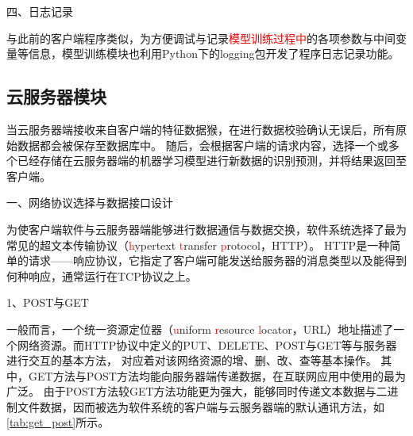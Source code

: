 四、日志记录

与此前的客户端程序类似，为方便调试与记录\textcolor{red}{模型训练过程中}的各项参数与中间变量等信息，模型训练模块也利用Python下的logging包\cite{logging}开发了程序日志记录功能。


\subsection{云服务器模块}
当云服务器端接收来自客户端的特征数据猴，在进行数据校验确认无误后，所有原始数据都会被保存至数据库中。
随后，会根据客户端的请求内容，选择一个或多个已经存储在云服务器端的机器学习模型进行新数据的识别预测，并将结果返回至客户端。


一、网络协议选择与数据接口设计

为使客户端软件与云服务器端能够进行数据通信与数据交换，软件系统选择了最为常见的超文本传输协议（\textcolor{red}{h}ypertext \textcolor{red}{t}ransfer \textcolor{red}{p}rotocol，HTTP）\cite{http}。
HTTP是一种简单的请求——响应协议，它指定了客户端可能发送给服务器的消息类型以及能得到何种响应，通常运行在TCP协议之上。

1、POST与GET

一般而言，一个统一资源定位器（\textcolor{red}{u}niform \textcolor{red}{r}esource \textcolor{red}{l}ocator，URL）地址描述了一个网络资源。而HTTP协议中定义的PUT、DELETE、POST与GET等与服务器进行交互的基本方法，
对应着对该网络资源的增、删、改、查等基本操作\cite{http}。
其中，GET方法与POST方法均能向服务器端传递数据，在互联网应用中使用的最为广泛。
由于POST方法较GET方法功能更为强大，能够同时传递文本数据与二进制文件数据，因而被选为软件系统的客户端与云服务器端的默认通讯方法，如\autoref{tab:get_post}所示。

